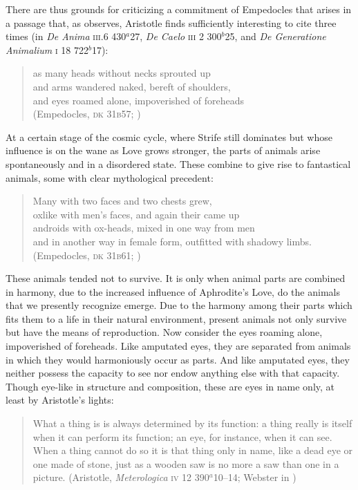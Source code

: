 There are thus grounds for criticizing a commitment of Empedocles that arises in a passage that, as \citet[211]{Wright:1981zr} observes, Aristotle finds sufficiently interesting to cite three times (in \emph{De Anima} \textsc{iii}.6 430\( ^{a} \)27, \emph{De Caelo} \textsc{iii} 2 300\( ^{b} \)25, and \emph{De Generatione Animalium} \textsc{i} 18 722\( ^{b} \)17):
\begin{verse}
	as many heads without necks sprouted up\\
	and arms wandered naked, bereft of shoulders,\\
	and eyes roamed alone, impoverished of foreheads\\
	(Empedocles, \textsc{dk} 31\textsc{b}57; \citealt[64 245]{Inwood:2001ve})
\end{verse}
At a certain stage of the cosmic cycle, where Strife still dominates but whose influence is on the wane as Love grows stronger, the parts of animals arise spontaneously and in a disordered state. These combine to give rise to fantastical animals, some with clear mythological precedent:
\begin{verse}
	Many with two faces and two chests grew,\\
	oxlike with men's faces, and again their came up\\
	androids with ox-heads, mixed in one way from men\\
	and in another way in female form, outfitted with shadowy limbs.\\
	(Empedocles, \textsc{dk} 31\textsc{b}61; \citealt[66 247]{Inwood:2001ve})
\end{verse}
These animals tended not to survive. It is only when animal parts are combined in harmony, due to the increased influence of Aphrodite's Love, do the animals that we presently recognize emerge. Due to the harmony among their parts which fits them to a life in their natural environment, present animals not only survive but have the means of reproduction. Now consider the eyes roaming alone, impoverished of foreheads. Like amputated eyes, they are separated from animals in which they would harmoniously occur as parts. And like amputated eyes, they neither possess the capacity to see nor endow anything else with that capacity. Though eye-like in structure and composition, these are eyes in name only, at least by Aristotle's lights:
\begin{quote}
	What a thing is is always determined by its function: a thing really is itself when it can perform its function; an eye, for instance, when it can see. When a thing cannot do so it is that thing only in name, like a dead eye or one made of stone, just as a wooden saw is no more a saw than one in a picture. (Aristotle, \emph{Meterologica} \textsc{iv} 12 390\( ^{a} \)10--14; Webster in \citealt[86]{Barnes:1984uq})
\end{quote}

